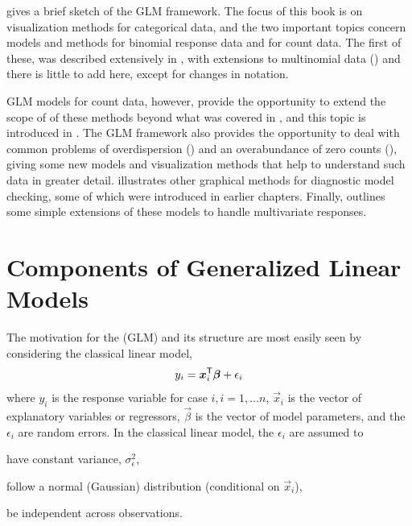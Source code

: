 \documentclass[11pt]{book}\usepackage[]{graphicx}\usepackage[]{color}
\begin{document}
 gives a brief sketch of the GLM framework.
The focus of this book is on visualization methods for categorical
data, and the two important topics concern models and methods for binomial response data
and for count data.  The first of these, 
was described extensively in
, 
with extensions to multinomial
data ()
and there is little to add here, except for changes
in notation.

GLM models for count data, however, provide the opportunity to extend 
the scope of of these methods beyond what was covered in ,
and this topic is introduced in .
The GLM framework also provides the opportunity to deal with common problems
of overdispersion () and an overabundance of
zero counts (), giving some new models and
visualization methods that help to understand such data in greater detail.
 illustrates other graphical methods for diagnostic
model checking, some of which were introduced in earlier chapters.
Finally,  outlines some simple extensions of these
models to handle multivariate responses.


\section{Components of Generalized Linear Models}\label{glm:components}

The motivation for the  (GLM) and its structure are most
easily seen by considering the classical linear model,
\begin{equation*}
y_i = \bm{x}_i^\mathsf{T} \bm{\beta} + \epsilon_i
\end{equation*}
where 
$y_i$ is the response variable for case $i, i=1, \dots n$,
$\vec{x}_i$ is the vector of explanatory variables or regressors, 
$\vec{\beta}$ is the vector of model parameters, and the
$\epsilon_i$ are random errors.
In the classical linear model, the $\epsilon_i$ are assumed to
\begin{seriate}
  \item have constant variance, $\sigma^2_\epsilon$,
  \item follow a normal (Gaussian) distribution (conditional on $\vec{x}_i$),
  \item be independent across observations.
\end{seriate}
\end{document}
